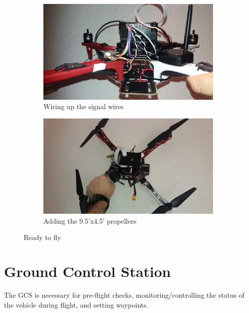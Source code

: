 \begin{figure}[H]
\begin{subfigure}{0.5\textwidth}
\centering
\includegraphics[scale=0.1]{images/drone-build-signal-wires.jpg}
\caption{Wiring up the signal wires}
\label{fig:attach_sbus}
\end{subfigure}
\begin{subfigure}{0.5\textwidth}
\centering
\includegraphics[scale=0.1]{images/drone-build-props.jpg}
\caption{Adding the 9.5'x4.5' propellers}
\label{fig:attach_props}
\end{subfigure}
\caption{Ready to fly}
\label{fig:attach_signal_props}
\end{figure}

\section{Ground Control Station}

The GCS is necessary for pre-flight checks, monitoring/controlling the status of the vehicle during flight, and setting waypoints.\\

